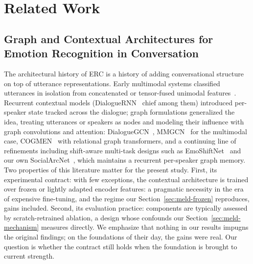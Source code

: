 \section{Related Work}
\label{sec:related-work}

\subsection{Graph and Contextual Architectures for Emotion Recognition in Conversation}

The architectural history of ERC is a history of adding conversational structure on top of utterance representations. Early multimodal systems classified utterances in isolation from concatenated or tensor-fused unimodal features~\cite{zadeh2017tfn}. Recurrent contextual models (DialogueRNN~\cite{dialoguernn2019} chief among them) introduced per-speaker state tracked across the dialogue; graph formulations generalized the idea, treating utterances or speakers as nodes and modeling their influence with graph convolutions and attention: DialogueGCN~\cite{dialoguegcn2019}, MMGCN~\cite{mmgcn2021} for the multimodal case, COGMEN~\cite{cogmen2022} with relational graph transformers, and a continuing line of refinements including shift-aware multi-task designs such as EmoShiftNet~\cite{emoshiftnet2025} and our own SocialArcNet~\cite{socialarcnet2026}, which maintains a recurrent per-speaker graph memory. Two properties of this literature matter for the present study. First, its experimental contract: with few exceptions, the contextual architecture is trained over frozen or lightly adapted encoder features: a pragmatic necessity in the era of expensive fine-tuning, and the regime our Section~\ref{sec:meld-frozen} reproduces, gains included. Second, its evaluation practice: components are typically assessed by scratch-retrained ablation, a design whose confounds our Section~\ref{sec:meld-mechanism} measures directly. We emphasize that nothing in our results impugns the original findings; on the foundations of their day, the gains were real. Our question is whether the contract still holds when the foundation is brought to current strength.


